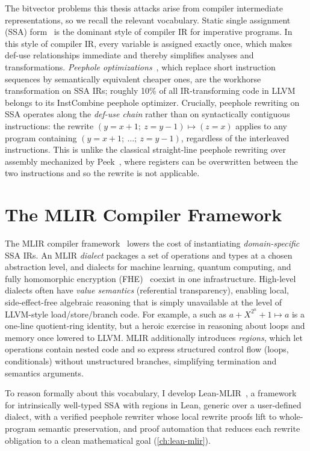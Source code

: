 The bitvector problems this thesis attacks arise from compiler intermediate
representations, so we recall the relevant vocabulary. Static single
assignment (SSA) form~\citep{rastello2022ssa} is the dominant style of
compiler IR for imperative programs.
In this style of compiler IR, every variable is assigned exactly once,
which makes def-use relationships immediate and thereby simplifies analyses and transformations.
\emph{Peephole optimizations}~\citep{mckeeman1965peephole}, which replace
short instruction sequences by semantically equivalent cheaper ones, are the
workhorse transformation on SSA IRs; roughly 10\% of all IR-transforming code
in LLVM~\citep{lattner2004llvm} belongs to its InstCombine peephole
optimizer. Crucially, peephole rewriting on SSA operates along the
\emph{def-use chain} rather than on syntactically contiguous instructions: the
rewrite
$(y = x + 1;\ z = y - 1) \mapsto (z = x)$ applies to any program containing
$(y = x + 1;\ \ldots;\ z = y - 1)$, regardless of the interleaved
instructions. This is unlike the classical straight-line peephole rewriting over
assembly mechanized by Peek~\citep{mullen2016verified}, where registers
can be overwritten between the two instructions and so the rewrite is not applicable.

\section{The MLIR Compiler Framework}

The MLIR compiler framework~\citep{lattner2021mlir} lowers the cost of
instantiating \emph{domain-specific} SSA IRs. An MLIR \emph{dialect} packages
a set of operations and types at a chosen abstraction level, and dialects for
machine learning, quantum computing, and fully homomorphic encryption
(FHE)~\citep{gentry2009fully,viand2022heco} coexist in one infrastructure.
High-level dialects often have \emph{value semantics} (referential transparency),
enabling local, side-effect-free algebraic reasoning that is simply unavailable at the level of LLVM-style load/store/branch code.
For example, a such as $a + X^{2^n} + 1 \mapsto a$ is a one-line quotient-ring
identity, but a heroic exercise in reasoning about loops and memory once lowered to LLVM.
MLIR additionally introduces \emph{regions}, which let operations contain nested code and so express
structured control flow (loops, conditionals) without unstructured branches,
simplifying termination and semantics arguments.

To reason formally about this vocabulary, I develop Lean-MLIR~\citep{leanmlir}, a
framework for intrinsically well-typed SSA with regions in Lean, generic over
a user-defined dialect, with a verified peephole rewriter whose local rewrite
proofs lift to whole-program semantic preservation, and proof automation that
reduces each rewrite obligation to a clean mathematical goal
(\cref{ch:lean-mlir}).

